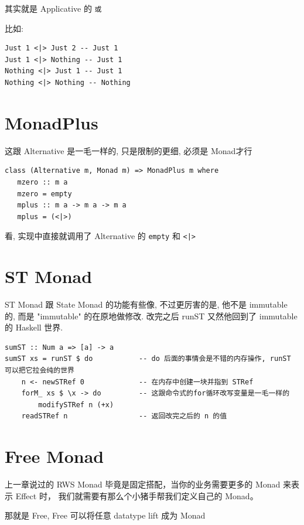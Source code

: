 \documentclass[letterspacing]{tufte-book}
\begin{document}
其实就是 Applicative 的 \texttt{或}

比如:
\lstset{language=haskell,label= ,caption= ,captionpos=b,numbers=none}
\begin{lstlisting}
Just 1 <|> Just 2 -- Just 1
Just 1 <|> Nothing -- Just 1
Nothing <|> Just 1 -- Just 1
Nothing <|> Nothing -- Nothing
\end{lstlisting}

\chapter{MonadPlus}
\label{sec:orgfe8531f}
这跟 Alternative 是一毛一样的, 只是限制的更细, 必须是 Monad才行

\lstset{language=haskell,label= ,caption= ,captionpos=b,numbers=none}
\begin{lstlisting}
class (Alternative m, Monad m) => MonadPlus m where
   mzero :: m a
   mzero = empty
   mplus :: m a -> m a -> m a
   mplus = (<|>)
\end{lstlisting}

看, 实现中直接就调用了 Alternative 的 \texttt{empty} 和 \texttt{<|>}

\chapter{ST Monad}
\label{sec:org9161e44}
ST Monad 跟 State Monad 的功能有些像, 不过更厉害的是, 他不是 immutable 的, 而是 "immutable" 的在原地做修改. 改完之后 runST 又然他回到了 immutable 的 Haskell 世界.

\lstset{language=haskell,label= ,caption= ,captionpos=b,numbers=none}
\begin{lstlisting}
sumST :: Num a => [a] -> a
sumST xs = runST $ do           -- do 后面的事情会是不错的内存操作, runST 可以把它拉会纯的世界
    n <- newSTRef 0             -- 在内存中创建一块并指到 STRef
    forM_ xs $ \x -> do         -- 这跟命令式的for循环改写变量是一毛一样的
        modifySTRef n (+x)
    readSTRef n                 -- 返回改完之后的 n 的值
\end{lstlisting}

\chapter{Free Monad}
\label{sec:orgf40b2be}
上一章说过的 RWS Monad 毕竟是固定搭配，当你的业务需要更多的 Monad 来表示 Effect 时，
我们就需要有那么个小猪手帮我们定义自己的 Monad。

那就是 Free, Free 可以将任意 datatype lift 成为 Monad
\end{document}
